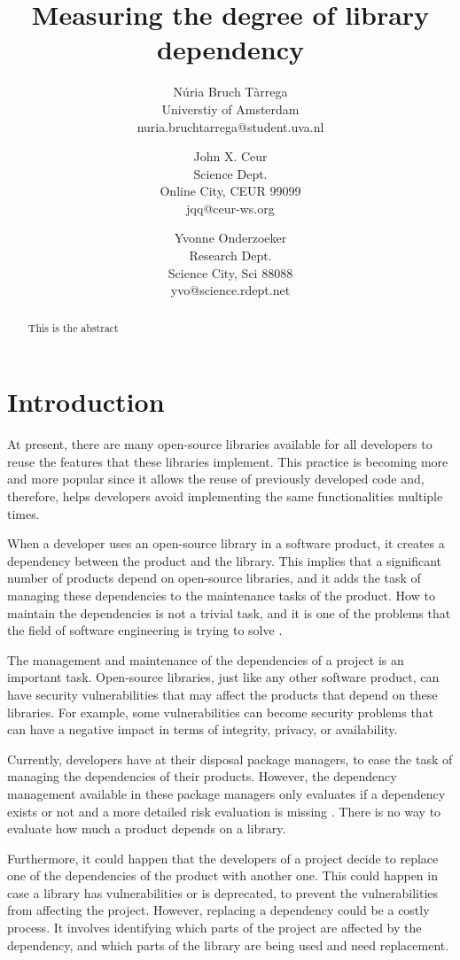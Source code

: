 \documentclass[a4paper]{article}
\title{Measuring the degree of library dependency}
\author{
Núria Bruch Tàrrega \\ Universtiy of Amsterdam \\ nuria.bruchtarrega@student.uva.nl
\and
John X. Ceur \\ Science Dept.\\
                Online City, CEUR 99099 \\ jqq@ceur-ws.org
\and
Yvonne Onderzoeker \\ Research Dept.\\
                Science City, Sci 88088 \\ yvo@science.rdept.net
}
\begin{document}
\maketitle

\begin{abstract}
This is the abstract
\end{abstract}


\section{Introduction}
At present, there are many open-source libraries available for all developers to reuse the features that these libraries implement. This practice is becoming more and more popular since it allows the reuse of previously developed code and, therefore, helps developers avoid implementing the same functionalities multiple times.

When a developer uses an open-source library in a software product, it creates a dependency between the product and the library. This implies that a significant number of products depend on open-source libraries, and it adds the task of managing these dependencies to the maintenance tasks of the product. How to maintain the dependencies is not a trivial task, and it is one of the problems that the field of software engineering is trying to solve \cite{kula2014visualizing}.

The management and maintenance of the dependencies of a project is an important task. Open-source libraries, just like any other software product, can have security vulnerabilities that may affect the products that depend on these libraries. For example, some vulnerabilities can become security problems that can have a negative impact in terms of integrity, privacy, or availability.

Currently, developers have at their disposal package managers, to ease the task of managing the dependencies of their products. However, the dependency management available in these package managers only evaluates if a dependency exists or not and a more detailed risk evaluation is missing \cite{hejderup2018prazi}. There is no way to evaluate how much a product depends on a library.

Furthermore, it could happen that the developers of a project decide to replace one of the dependencies of the product with another one. This could happen in case a library has vulnerabilities or is deprecated, to prevent the vulnerabilities from affecting the project. However, replacing a dependency could be a costly process. It involves identifying which parts of the project are affected by the dependency, and which parts of the library are being used and need replacement.
\end{document}
